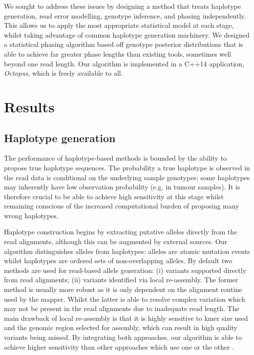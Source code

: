 \documentclass[notitlepage, twocolumn]{article}
\begin{document}
We sought to address these issues by designing a method that treats haplotype generation, read error modelling, genotype inference, and phasing independently. This allows us to apply the most appropriate statistical model at each stage, whilst taking advantage of common haplotype generation machinery. We designed a statistical phasing algorithm based off genotype posterior distributions that is able to achieve far greater phase lengths than existing tools, sometimes well beyond one read length. Our algorithm is implemented in a C++14 application, \emph{Octopus}, which is freely available to all.

\section*{Results}

\subsection*{Haplotype generation}

The performance of haplotype-based methods is bounded by the ability to propose true haplotype sequences. The probability a true haplotype is observed in the read data is conditional on the underlying sample genotypes; some haplotypes may inherently have low observation probability (e.g. in tumour samples). It is therefore crucial to be able to achieve high sensitivity at this stage whilst remaining conscious of the increased computational burden of proposing many wrong haplotypes.

Haplotype construction begins by extracting putative alleles directly from the read alignments, although this can be augmented by external sources. Our algorithm distinguishes alleles from haplotypes: alleles are atomic mutation events whilst haplotypes are ordered sets of non-overlapping alleles. By default two methods are used for read-based allele generation: (i) variants supported directly from read alignments; (ii) variants identified via local re-assembly. The former method is usually more robust as it is only dependent on the alignment routine used by the mapper. Whilst the latter is able to resolve complex variation which may not be present in the read alignments due to inadequate read length. The main drawback of local re-assembly is that it is highly sensitive to kmer size used and the genomic region selected for assembly, which can result in high quality variants being missed. By integrating both approaches, our algorithm is able to achieve higher sensitivity than other approaches which use one or the other \cite{RN141, RN538}.
\end{document}
